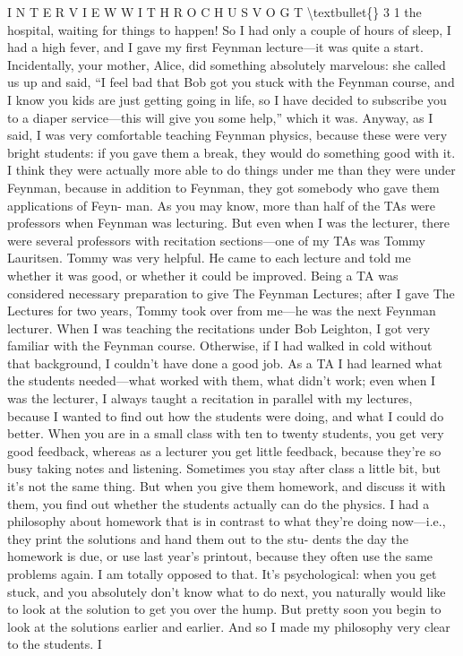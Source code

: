 \documentclass[10pt,oneside]{article}
\begin{document}
I N T E R V I E W  W I T H  R O C H U S  V O G T \textbackslash{}textbullet\{\} 3 1 the hospital, waiting for things to happen! So I had only a couple of hours of sleep, I had a high fever, and I gave my first Feynman lecture---it was quite a start. Incidentally, your mother, Alice, did something absolutely marvelous: she called us up and said, “I feel bad that Bob got you stuck with the Feynman course, and I know you kids are just getting going in life, so I have decided to subscribe you to a diaper service---this will give you some help,” which it was. Anyway, as I said, I was very comfortable teaching Feynman physics, because these were very bright students: if you gave them a break, they would do something good with it. I think they were actually more able to do things under me than they were under Feynman, because in addition to Feynman, they got somebody who gave them applications of Feyn- man. As you may know, more than half of the TAs were professors when Feynman was lecturing. But even when I was the lecturer, there were several professors with recitation sections---one of my TAs was Tommy Lauritsen. Tommy was very helpful. He came to each lecture and told me whether it was good, or whether it could be improved. Being a TA was considered necessary preparation to give The Feynman Lectures; after I gave The Lectures for two years, Tommy took over from me---he was the next Feynman lecturer. When I was teaching the recitations under Bob Leighton, I got very familiar with the Feynman course. Otherwise, if I had walked in cold without that background, I couldn’t have done a good job. As a TA I had learned what the students needed---what worked with them, what didn’t work; even when I was the lecturer, I always taught a recitation in parallel with my lectures, because I wanted to find out how the students were doing, and what I could do better. When you are in a small class with ten to twenty students, you get very good feedback, whereas as a lecturer you get little feedback, because they’re so busy taking notes and listening. Sometimes you stay after class a little bit, but it’s not the same thing. But when you give them homework, and discuss it with them, you find out whether the students actually can do the physics. I had a philosophy about homework that is in contrast to what they’re doing now---i.e., they print the solutions and hand them out to the stu- dents the day the homework is due, or use last year’s printout, because they often use the same problems again. I am totally opposed to that. It’s psychological: when you get stuck, and you absolutely don’t know what to do next, you naturally would like to look at the solution to get you over the hump. But pretty soon you begin to look at the solutions earlier and earlier. And so I made my philosophy very clear to the students. I\par
\end{document}
